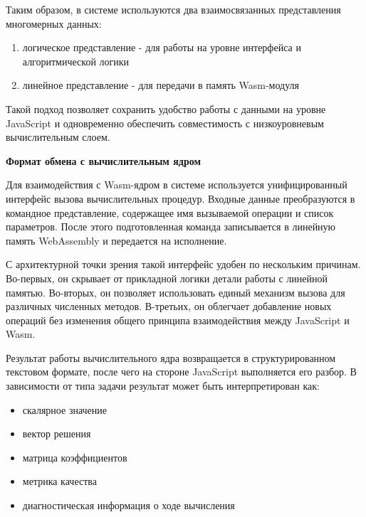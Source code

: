 \documentclass[12pt, oneside]{book}
\begin{document}
    \quad Таким образом, в системе используются два взаимосвязанных представления многомерных данных:

    \begin{enumerate}
        \item логическое представление - для работы на уровне интерфейса и алгоритмической логики
        \item линейное представление - для передачи в память Wasm-модуля
    \end{enumerate}

    \quad Такой подход позволяет сохранить удобство работы с данными на уровне JavaScript и одновременно обеспечить совместимость с низкоуровневым вычислительным слоем.


    \vspace{0.5em}

    \textbf{\large Формат обмена с вычислительным ядром}

    \vspace{0.5em}

    \quad Для взаимодействия с Wasm-ядром в системе используется унифицированный интерфейс вызова вычислительных процедур. Входные данные преобразуются в командное представление, содержащее имя вызываемой операции и список параметров. После этого подготовленная команда записывается в линейную память WebAssembly и передается на исполнение.

    \quad С архитектурной точки зрения такой интерфейс удобен по нескольким причинам. Во-первых, он скрывает от прикладной логики детали работы с линейной памятью. Во-вторых, он позволяет использовать единый механизм вызова для различных численных методов. В-третьих, он облегчает добавление новых операций без изменения общего принципа взаимодействия между JavaScript и Wasm.

    \quad Результат работы вычислительного ядра возвращается в структурированном текстовом формате, после чего на стороне JavaScript выполняется его разбор. В зависимости от типа задачи результат может быть интерпретирован как:

    \begin{itemize}
        \item скалярное значение
        \item вектор решения
        \item матрица коэффициентов
        \item метрика качества
        \item диагностическая информация о ходе вычисления
    \end{itemize}
\end{document}
